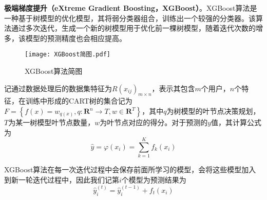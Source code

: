 \documentclass{MathorCupModeling}
\begin{document}
	\textbf{极端梯度提升（eXtreme Gradient Boosting，XGBoost）}。XGBoost算法是一种基于树模型的优化模型，其将弱分类器组合，训练出一个较强的分类器。该算法通过多次迭代，生成一个新的树模型用于优化前一棵树模型，随着迭代次数的增多，该模型的预测精度也会相应提高\textcolor{blue}{\cite{pxgboost1}}。
	\begin{figure}[H]
		\centerline{\texttt{[image: XGBoost简图.pdf]}}
		\caption{XGBoost算法简图}\label{fig:XGBoost}
	\end{figure}
		记通过数据处理后的数据集特征为$R\left(x_{ij}\right)_{m\times n}$，表示其包含$m$个用户，$n$个特征，在训练中形成的CART树的集合记为$F=\left\{f\left(x\right)=w_{q\left(x\right)},q:\mathbf{R}^n\to T,w\in \mathbf{R}^T\right\}$，其中$q$为树模型的叶节点决策规划，$T$为某一树模型叶节点数量，$w$为叶节点对应的得分\textcolor{blue}{\cite{pxgboost2}}。对于预测的$y$值，其计算公式为
		\begin{equation}
			\hat{y}=\varphi \left( x_i \right) =\sum\limits_{k=1}^K{f_k\left( x_i \right)} \label{fXGBoostypre}
		\end{equation}
	
		XGBoost算法在每一次迭代过程中会保存前面所学习的模型，会将这些模型加入到新一轮迭代过程中，因此我们记第$i$个模型为预测结果为
		\begin{equation}
			\hat{y}_{i}^{\left(t\right)}=\hat{y}_{i}^{\left(t-1\right)}+f_t\left(x_i\right) \label{fXGBoostyprei}
		\end{equation}
		
\end{document}
